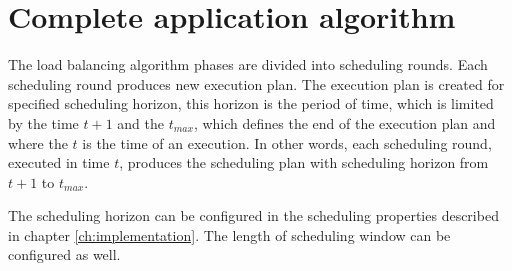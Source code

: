 \section{Complete application algorithm}\label{sec:olb-algorithm}

The load balancing algorithm phases are divided into scheduling rounds.
Each scheduling round produces new execution plan.
The execution plan is created for specified scheduling horizon,
this horizon is the period of time,
which is limited by the time $t+1$ and the $t_{max}$, 
which defines the end of the execution plan
and where the $t$ is the time of an execution.
In other words,
each scheduling round, executed in time $t$,
produces the scheduling plan with scheduling horizon from $t+1$ to $t_{max}$.

The scheduling horizon can be configured in the scheduling properties described in chapter \ref{ch:implementation}.
The length of scheduling window can be configured as well. 

